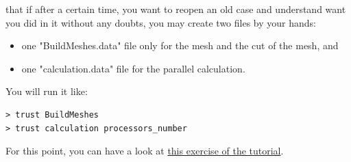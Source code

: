 \Note that if after a certain time, you want to reopen an old case and understand want you did in it without any doubts, you may create two files by your hands:
\begin{itemize} 
\item one "BuildMeshes.data" file only for the mesh and the cut of the mesh, and
\item one "calculation.data" file for the parallel calculation. 
\end{itemize}
You will run it like:
\begin{verbatim}
> trust BuildMeshes
> trust calculation processors_number
\end{verbatim}

For this point, you can have a look at \href{TRUST_tutorial.pdf\#prm_para}{this exercise of the \trust tutorial}.





